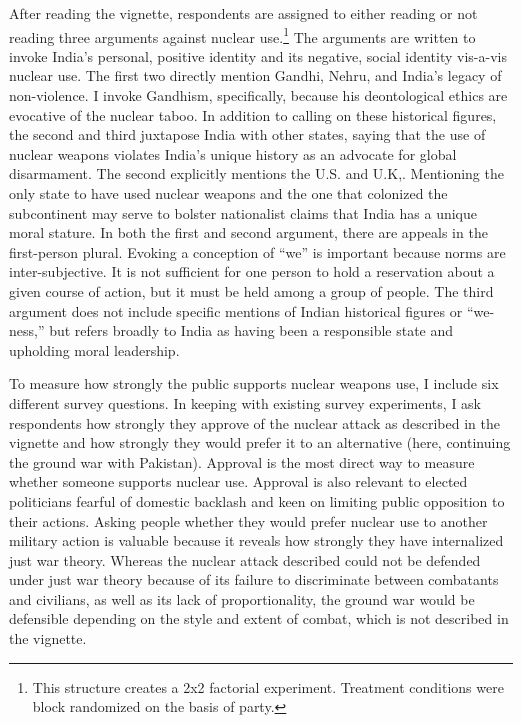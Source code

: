 \documentclass[12pt]{article}
\begin{document}
After reading the vignette, respondents are assigned to either reading or not reading three arguments against nuclear use.\footnote{This structure creates a 2x2 factorial experiment. Treatment conditions were block randomized on the basis of party.} The arguments are written to invoke India's personal, positive identity and its negative, social identity vis-a-vis nuclear use. The first two directly mention Gandhi, Nehru, and India's legacy of non-violence. I invoke Gandhism, specifically, because his deontological ethics are evocative of the nuclear taboo. In addition to calling on these historical figures, the second and third juxtapose India with other states, saying that the use of nuclear weapons violates India's unique history as an advocate for global disarmament. The second explicitly mentions the U.S. and U.K,. Mentioning the only state to have used nuclear weapons and the one that colonized the subcontinent may serve to bolster nationalist claims that India has a unique moral stature. In both the first and second argument, there are appeals in the first-person plural. Evoking a conception of “we” is important because norms are inter-subjective. It is not sufficient for one person to hold a reservation about a given course of action, but it must be held among a group of people. The third argument does not include specific mentions of Indian historical figures or “we-ness,” but refers broadly to India as having been a responsible state and upholding moral leadership. 

To measure how strongly the public supports nuclear weapons use, I include six different survey questions. In keeping with existing survey experiments, I ask respondents how strongly they approve of the nuclear attack as described in the vignette and how strongly they would prefer it to an alternative (here, continuing the ground war with Pakistan). Approval is the most direct way to measure whether someone supports nuclear use. Approval is also relevant to elected politicians fearful of domestic backlash and keen on limiting public opposition to their actions. Asking people whether they would prefer nuclear use to another military action is valuable because it reveals how strongly they have internalized just war theory. Whereas the nuclear attack described could not be defended under just war theory because of its failure to discriminate between combatants and civilians, as well as its lack of proportionality, the ground war would be defensible depending on the style and extent of combat, which is not described in the vignette. 
\end{document}
